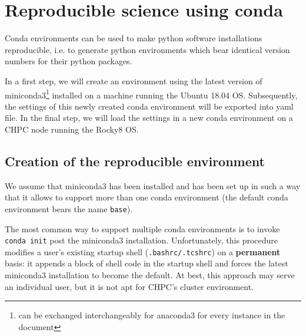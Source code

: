 \documentclass[10pt]{article}
\begin{document}
\title{}
\author{Wim R.M. Cardoen \\ Email: \$(prefix)[at]gmail[dot]com \\ where \\ prefix='wcardoen' }
\date{\today}
\maketitle
\thispagestyle{empty}
\pagestyle{plain}
\setcounter{page}{1}
\renewcommand \thesection{\Roman{section}} 

\section{Reproducible science using conda}
Conda environments can be used to make python software installations reproducible, i.e. to generate 
python environments which bear identical version numbers for their python packages. 

In a first step, we will create an environment using the latest version of miniconda3\footnote{can be exchanged interchangeably for anaconda3 for every
instance in the document} 
installed on a machine running the Ubuntu 18.04 OS. Subsequently, the settings of this newly created conda environment will be exported into yaml file.
In the final step, we will load the settings in a new conda environment on a CHPC node running the Rocky8 OS.

\subsection{Creation of the reproducible environment} 

We assume that miniconda3 has been installed and has been set up in such a way that it allows to support 
more than one conda environment (the default conda environment bears the name \texttt{base}).

The most common way to support multiple conda environments is to invoke \lstinline[language=bash]{conda init} post the miniconda3 installation.
Unfortunately, this procedure modifies a user's existing startup shell (\lstinline[language=bash]{.bashrc/.tcshrc}) on a \textbf{permanent} basis: 
it appends a block of shell code in the startup shell and forces the latest miniconda3 installation to become the default.
At best, this approach may serve an individual user, but it is not apt for CHPC's cluster environment.
\end{document}
